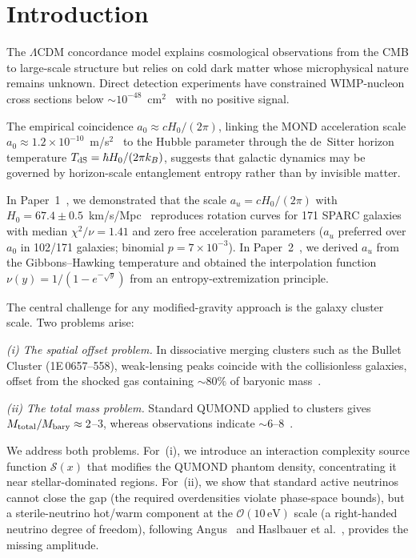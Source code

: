 \documentclass[aps,prd,twocolumn,superscriptaddress,nofootinbib]{revtex4-2}
\newcommand{\au}{a_u}
\newcommand{\Ssrc}{\mathcal{S}}
\begin{document}
\maketitle

\section{Introduction}
\label{sec:intro}

The $\Lambda$CDM concordance model explains cosmological observations from the CMB to large-scale structure but relies on cold dark matter whose microphysical nature remains unknown. Direct detection experiments have constrained WIMP-nucleon cross sections below $\sim 10^{-48}$~cm$^2$~\cite{LZ2022} with no positive signal.

The empirical coincidence $a_0\approx cH_0/(2\pi)$, linking the MOND acceleration scale $a_0\approx 1.2\times 10^{-10}$~m/s$^2$~\cite{McGaugh2016} to the Hubble parameter through the de~Sitter horizon temperature $T_{\rm dS}=\hbar H_0/(2\pi k_B)$, suggests that galactic dynamics may be governed by horizon-scale entanglement entropy rather than by invisible matter.

In Paper~1~\cite{Paper1}, we demonstrated that the scale $\au=cH_0/(2\pi)$ with $H_0=67.4\pm 0.5$~km/s/Mpc~\cite{Planck2018} reproduces rotation curves for 171 SPARC galaxies~\cite{Lelli2016} with median $\chi^2/\nu=1.41$ and zero free acceleration parameters ($\au$ preferred over $a_0$ in 102/171 galaxies; binomial $p=7\times 10^{-3}$). In Paper~2~\cite{Paper2}, we derived $\au$ from the Gibbons--Hawking temperature and obtained the interpolation function $\nu(y)=1/(1-e^{-\sqrt{y}})$ from an entropy-extremization principle.

The central challenge for any modified-gravity approach is the galaxy cluster scale. Two problems arise:

\textit{(i) The spatial offset problem.} In dissociative merging clusters such as the Bullet Cluster (1E\,0657--558), weak-lensing peaks coincide with the collisionless galaxies, offset from the shocked gas containing $\sim 80\%$ of baryonic mass~\cite{Clowe2006,Bradac2006}.

\textit{(ii) The total mass problem.} Standard QUMOND applied to clusters gives $M_{\rm total}/M_{\rm bary}\approx 2$--$3$, whereas observations indicate $\sim 6$--$8$~\cite{Sanders2003,Angus2008}.

We address both problems. For~(i), we introduce an interaction complexity source function $\Ssrc(x)$ that modifies the QUMOND phantom density, concentrating it near stellar-dominated regions. For~(ii), we show that standard active neutrinos cannot close the gap (the required overdensities violate phase-space bounds), but a sterile-neutrino hot/warm component at the $\mathcal{O}(10\,\mathrm{eV})$ scale (a right-handed neutrino degree of freedom), following Angus~\cite{Angus2009} and Haslbauer et al.~\cite{Haslbauer2020}, provides the missing amplitude.
\end{document}
